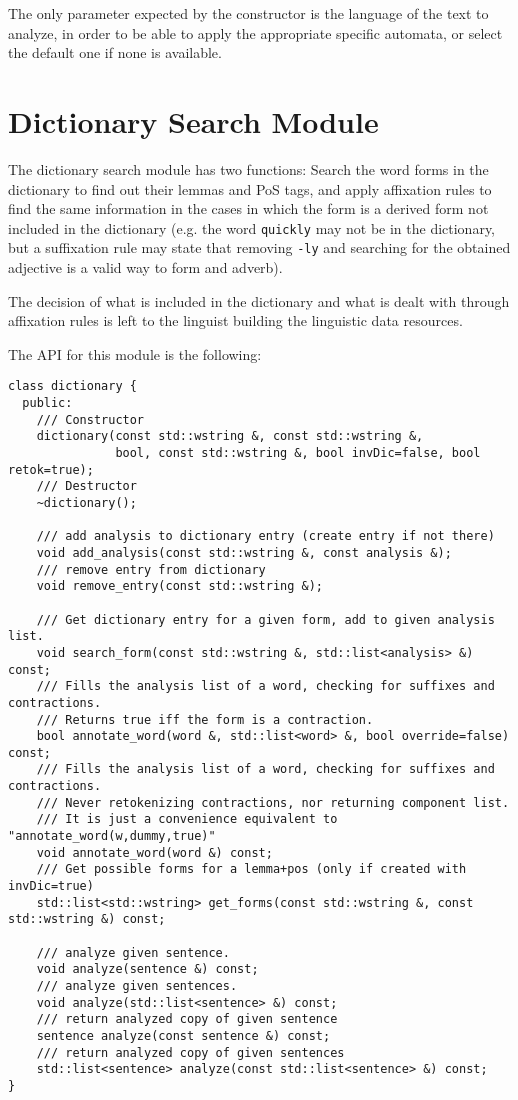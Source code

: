 \documentclass[a4paper]{book}
\begin{document}
   The only parameter expected by the constructor is the language of
   the text to analyze, in order to be able to apply the appropriate
   specific automata, or select the default one if none is available.


\section{Dictionary Search Module}
\label{file-dict}

The dictionary search module has two functions: Search the word forms
in the dictionary to find out their lemmas and PoS tags, and apply
affixation rules to find the same information in the cases in which
the form is a derived form not included in the dictionary (e.g. the
word {\tt quickly} may not be in the dictionary, but a suffixation
rule may state that removing {\tt -ly} and searching for the obtained
adjective is a valid way to form and adverb).

The decision of what is included in the dictionary and what is dealt
with through affixation rules is left to the linguist building the 
linguistic data resources.

\noindent The API for this module is the following:
\begin{verbatim}
class dictionary {
  public:
    /// Constructor
    dictionary(const std::wstring &, const std::wstring &, 
               bool, const std::wstring &, bool invDic=false, bool retok=true);
    /// Destructor
    ~dictionary();

    /// add analysis to dictionary entry (create entry if not there)
    void add_analysis(const std::wstring &, const analysis &);
    /// remove entry from dictionary
    void remove_entry(const std::wstring &);

    /// Get dictionary entry for a given form, add to given analysis list.
    void search_form(const std::wstring &, std::list<analysis> &) const;
    /// Fills the analysis list of a word, checking for suffixes and contractions.
    /// Returns true iff the form is a contraction.
    bool annotate_word(word &, std::list<word> &, bool override=false) const;
    /// Fills the analysis list of a word, checking for suffixes and contractions.
    /// Never retokenizing contractions, nor returning component list.
    /// It is just a convenience equivalent to "annotate_word(w,dummy,true)"
    void annotate_word(word &) const;
    /// Get possible forms for a lemma+pos (only if created with invDic=true)
    std::list<std::wstring> get_forms(const std::wstring &, const std::wstring &) const;

    /// analyze given sentence.
    void analyze(sentence &) const;
    /// analyze given sentences.
    void analyze(std::list<sentence> &) const;
    /// return analyzed copy of given sentence
    sentence analyze(const sentence &) const;
    /// return analyzed copy of given sentences
    std::list<sentence> analyze(const std::list<sentence> &) const;
}
\end{verbatim}
\end{document}
